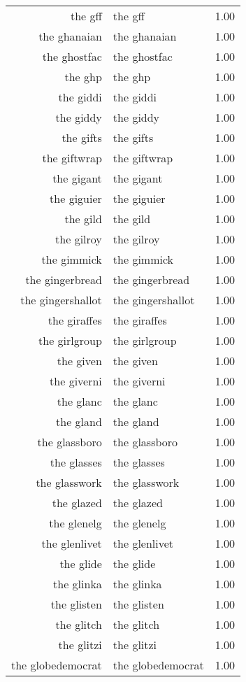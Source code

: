 \begin{table}[ht]
\begin{tabular}{rlr}
  the gff & the gff & 1.00 \\ 
  the ghanaian & the ghanaian & 1.00 \\ 
  the ghostfac & the ghostfac & 1.00 \\ 
  the ghp & the ghp & 1.00 \\ 
  the giddi & the giddi & 1.00 \\ 
  the giddy & the giddy & 1.00 \\ 
  the gifts & the gifts & 1.00 \\ 
  the giftwrap & the giftwrap & 1.00 \\ 
  the gigant & the gigant & 1.00 \\ 
  the giguier & the giguier & 1.00 \\ 
  the gild & the gild & 1.00 \\ 
  the gilroy & the gilroy & 1.00 \\ 
  the gimmick & the gimmick & 1.00 \\ 
  the gingerbread & the gingerbread & 1.00 \\ 
  the gingershallot & the gingershallot & 1.00 \\ 
  the giraffes & the giraffes & 1.00 \\ 
  the girlgroup & the girlgroup & 1.00 \\ 
  the given & the given & 1.00 \\ 
  the giverni & the giverni & 1.00 \\ 
  the glanc & the glanc & 1.00 \\ 
  the gland & the gland & 1.00 \\ 
  the glassboro & the glassboro & 1.00 \\ 
  the glasses & the glasses & 1.00 \\ 
  the glasswork & the glasswork & 1.00 \\ 
  the glazed & the glazed & 1.00 \\ 
  the glenelg & the glenelg & 1.00 \\ 
  the glenlivet & the glenlivet & 1.00 \\ 
  the glide & the glide & 1.00 \\ 
  the glinka & the glinka & 1.00 \\ 
  the glisten & the glisten & 1.00 \\ 
  the glitch & the glitch & 1.00 \\ 
  the glitzi & the glitzi & 1.00 \\ 
  the globedemocrat & the globedemocrat & 1.00 \\ 

\end{tabular}
\end{table}
